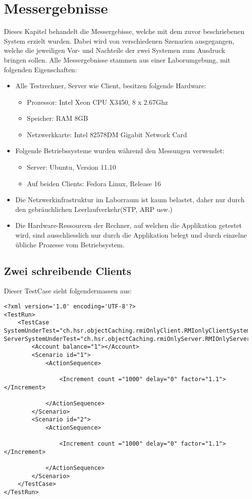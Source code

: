 \chapter{Messergebnisse}

Dieses Kapitel behandelt die Messergebisse, welche mit dem zuvor beschriebenen System erzielt wurden. Dabei wird von verschiedenen Szenarien ausgegangen, welche die jeweiligen Vor- und Nachteile der zwei Systemen zum Ausdruck bringen sollen. \newline
Alle Messergebnisse stammen aus einer Laborumgebung, mit folgenden Eigenschaften:
\begin{itemize}
\item Alle Testrechner, Server wie Client, besitzen folgende Hardware:
\begin{itemize}
\item Prozessor: Intel Xeon CPU X3450, 8 x 2.67Ghz
\item Speicher: RAM 8GB
\item Netzwerkkarte: Intel 82578DM Gigabit Network Card
\end{itemize}
\item Folgende Betriebssysteme wurden während den Messungen verwendet:
\begin{itemize}
\item Server: Ubuntu, Version 11.10
\item Auf beiden Clients: Fedora Linux, Release 16
\end{itemize}
\item Die Netzwerkinfrastruktur im Laborraum ist kaum belastet, daher nur durch den gebräuchlichen Leerlaufverkehr(STP, ARP usw.)
\item Die Hardware-Ressourcen der Rechner, auf welchen die Applikation getestet wird, sind ausschliesslich nur durch die Applikation belegt und durch einzelne übliche Prozesse vom  Betriebsystem.
\end{itemize}

\section{Zwei schreibende Clients}

Dieser TestCase sieht folgendermassen aus:
\begin{lstlisting}
<?xml version='1.0' encoding='UTF-8'?>
<TestRun>
	<TestCase SystemUnderTest="ch.hsr.objectCaching.rmiOnlyClient.RMIonlyClientSystem" ServerSystemUnderTest="ch.hsr.objectCaching.rmiOnlyServer.RMIOnlyServerSystem">
		<Account balance="1"></Account>
		<Scenario id="1">
			<ActionSequence>

				<Increment count ="1000" delay="0" factor="1.1"></Increment>

			</ActionSequence>
		</Scenario>
		<Scenario id="2">
			<ActionSequence>

				<Increment count ="1000" delay="0" factor="1.1"></Increment>

			</ActionSequence>
		</Scenario>
	</TestCase>
</TestRun>
\end{lstlisting}

